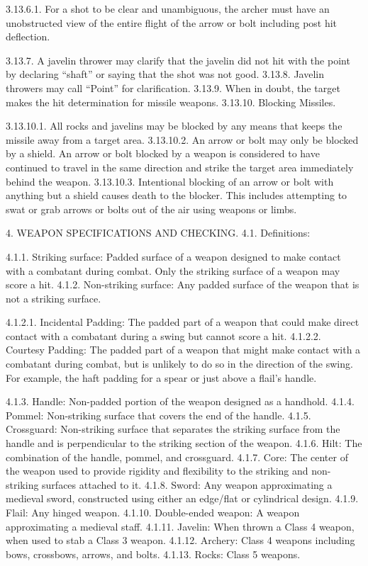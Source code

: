 \documentclass[12pt]{article}
\begin{document}
\begin{level}[start=0]
3.13.6.1. For a shot to be clear and unambiguous, the archer must have an unobstructed view of the entire flight of the arrow or bolt including post hit deflection.

3.13.7. A javelin thrower may clarify that the javelin did not hit with the point by declaring “shaft” or saying that the shot was not good.
3.13.8. Javelin throwers may call “Point” for clarification.
3.13.9. When in doubt, the target makes the hit determination for missile weapons.
3.13.10. Blocking Missiles.

3.13.10.1. All rocks and javelins may be blocked by any means that keeps the missile away from a target area.
3.13.10.2. An arrow or bolt may only be blocked by a shield. An arrow or bolt blocked by a weapon is considered to have continued to travel in the same direction and strike the target area immediately behind the weapon.
3.13.10.3. Intentional blocking of an arrow or bolt with anything but a shield causes death to the blocker. This includes attempting to swat or grab arrows or bolts out of the air using weapons or limbs.

4. WEAPON SPECIFICATIONS AND CHECKING.
4.1. Definitions:

4.1.1. Striking surface: Padded surface of a weapon designed to make contact with a combatant during combat. Only the striking surface of a weapon may score a hit.
4.1.2. Non-striking surface: Any padded surface of the weapon that is not a striking surface.

4.1.2.1. Incidental Padding: The padded part of a weapon that could make direct contact with a combatant during a swing but cannot score a hit.
4.1.2.2. Courtesy Padding: The padded part of a weapon that might make contact with a combatant during combat, but is unlikely to do so in the direction of the swing. For example, the haft padding for a spear or just above a flail’s handle.

4.1.3. Handle: Non-padded portion of the weapon designed as a handhold.
4.1.4. Pommel: Non-striking surface that covers the end of the handle.
4.1.5. Crossguard: Non-striking surface that separates the striking surface from the handle and is perpendicular to the striking section of the weapon.
4.1.6. Hilt: The combination of the handle, pommel, and crossguard.
4.1.7. Core: The center of the weapon used to provide rigidity and flexibility to the striking and non-striking surfaces attached to it.
4.1.8. Sword: Any weapon approximating a medieval sword, constructed using either an edge/flat or cylindrical design.
4.1.9. Flail: Any hinged weapon.
4.1.10. Double-ended weapon: A weapon approximating a medieval staff.
4.1.11. Javelin: When thrown a Class 4 weapon, when used to stab a Class 3 weapon.
4.1.12. Archery: Class 4 weapons including bows, crossbows, arrows, and bolts.
4.1.13. Rocks: Class 5 weapons.


\end{level}
\end{document}
